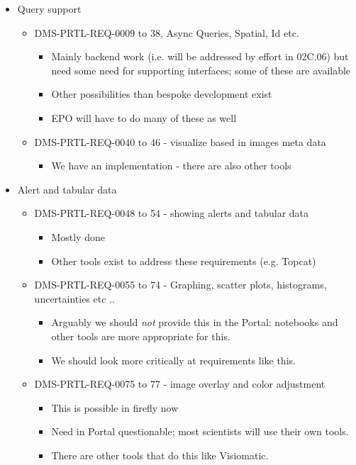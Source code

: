\begin{itemize}
\item Query support
\begin{itemize}
\item DMS-PRTL-REQ-0009 to 38, Async Queries, Spatial, Id etc.
\begin{itemize}
\item Mainly backend work (i.e. will be addressed by effort in 02C.06) but need some need for supporting interfaces; some of these are available
\item Other possibilities than bespoke development exist
\item EPO will have to do many of these as well
\end{itemize}
\item DMS-PRTL-REQ-0040 to 46 - visualize based in images meta data
\begin{itemize}
\item  We have an implementation - there are also other tools
\end{itemize}
\end{itemize}


\item Alert and tabular data
\begin{itemize}
\item DMS-PRTL-REQ-0048 to 54 - showing alerts and tabular data
\begin{itemize}
\item Mostly done
\item Other tools exist to address these requirements (e.g. Topcat)
\end{itemize}
\item DMS-PRTL-REQ-0055 to 74 - Graphing, scatter plots, histograms, uncertainties etc ..
\begin{itemize}
\item Arguably we should \emph{not} provide this in the Portal: notebooks and other tools are more appropriate for this.
\item We should look more critically at requirements like this.
\end{itemize}
\item DMS-PRTL-REQ-0075 to 77 - image overlay and color adjustment
\begin{itemize}
\item This is possible in firefly now
\item Need in Portal questionable; most scientists will use their own tools.
\item There are other tools that do this like Visiomatic.
\end{itemize}



\end{itemize}
\end{itemize}
